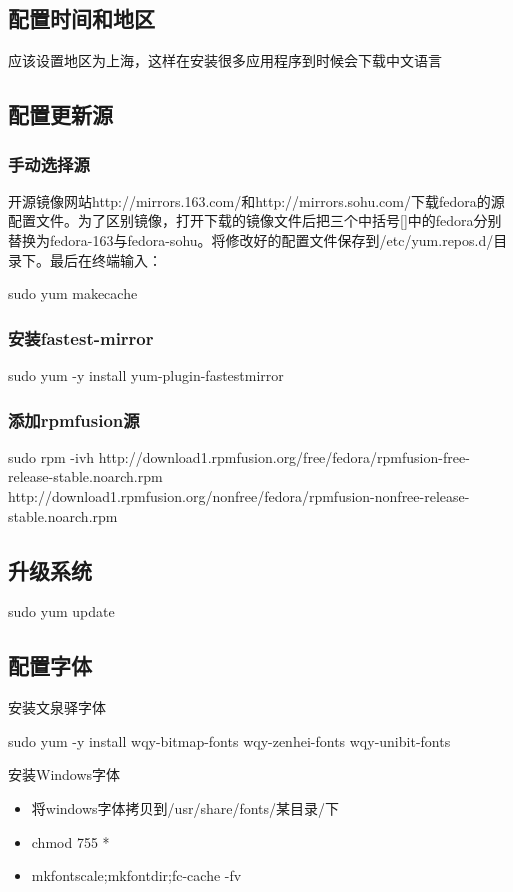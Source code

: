 \subsection{配置时间和地区}
应该设置地区为上海，这样在安装很多应用程序到时候会下载中文语言
\subsection{配置更新源}
\subsubsection{手动选择源}
开源镜像网站http://mirrors.163.com/和http://mirrors.sohu.com/下载fedora的源配置文件。为了区别镜像，打开下载的镜像文件后把三个中括号[]中的fedora分别替换为fedora-163与fedora-sohu。将修改好的配置文件保存到/etc/yum.repos.d/目录下。最后在终端输入：
\begin{shellcmd}
sudo yum makecache
\end{shellcmd}

\subsubsection{安装fastest-mirror}
\begin{shellcmd}
sudo yum -y install yum-plugin-fastestmirror 
\end{shellcmd}
\subsubsection{添加rpmfusion源}
\begin{shellcmd}
sudo rpm -ivh http://download1.rpmfusion.org/free/fedora/rpmfusion-free-release-stable.noarch.rpm 
http://download1.rpmfusion.org/nonfree/fedora/rpmfusion-nonfree-release-stable.noarch.rpm
\end{shellcmd}

\subsection{升级系统}
\begin{shellcmd}
sudo yum update
\end{shellcmd}

\subsection{配置字体}
安装文泉驿字体
\begin{shellcmd}
sudo yum -y install wqy-bitmap-fonts wqy-zenhei-fonts wqy-unibit-fonts
\end{shellcmd}
安装Windows字体
\begin{itemize}
\item 将windows字体拷贝到/usr/share/fonts/某目录/下
\item chmod 755 *
\item mkfontscale;mkfontdir;fc-cache -fv
\end{itemize}


